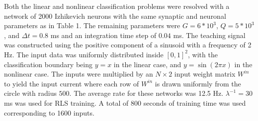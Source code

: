 \documentclass[11pt]{article} %
\begin{document}
Both the linear and nonlinear classification problems were resolved with a network of 2000 Izhikevich neurons with the same synaptic and neuronal parameters as in Table 1.  The remaining parameters were $G =6*10^3$, $Q=5*10^3$, and $\Delta t = 0.8$ ms and an integration time step of $0.04$ ms.   The teaching signal was constructed using the positive component of a sinusoid with a frequency of 2 Hz.  The input data was uniformly distributed inside $[0,1]^2$, with the classification boundary being $y=x$ in the linear case, and $y= \sin(2\pi x)$ in the nonlinear case.  The inputs were multiplied by an $N\times 2$ input weight matrix  $W^{in}$ to yield the input current where each row of $W^{in}$ is drawn uniformly from the circle with radius $500$.  The average rate for these networks was 12.5 Hz.  $\lambda^{-1} =30$ ms was used for RLS training.  A total of 800 seconds of training time was used corresponding to 1600 inputs.
\end{document}
